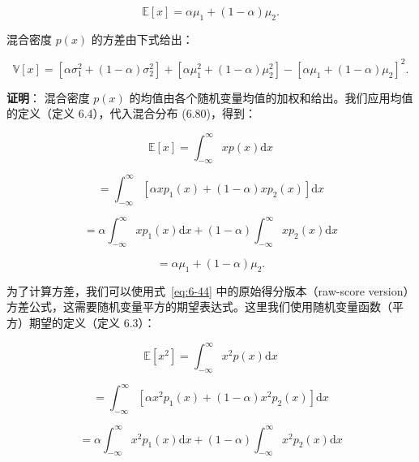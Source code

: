 \begin{equation}
\mathbb{E}[x] = \alpha \mu_1 + (1 - \alpha)\mu_2 .
\tag{6.81}\label{eq:6-81}
\end{equation}

混合密度 $ p(x) $ 的方差由下式给出：

\begin{equation}
\mathbb{V}[x] = [\alpha\sigma_1^2 + (1 - \alpha)\sigma_2^2] + [\alpha\mu_1^2 + (1 - \alpha)\mu_2^2] - [\alpha\mu_1 + (1 - \alpha)\mu_2]^2 .
\tag{6.82}\label{eq:6-82}
\end{equation}

\textbf{证明}： 混合密度 $ p(x) $ 的均值由各个随机变量均值的加权和给出。我们应用均值的定义（定义 6.4），代入混合分布 (6.80)，得到：

\begin{equation}
\mathbb{E}[x] = \int_{-\infty}^\infty x p(x) \mathrm{d}x
\tag{6.83a}\label{eq:6-83a}
\end{equation}

\begin{equation}
= \int_{-\infty}^\infty \left[\alpha x p_1(x) + (1 - \alpha) x p_2(x)\right] \mathrm{d}x
\tag{6.83b}\label{eq:6-83b}
\end{equation}

\begin{equation}
= \alpha \int_{-\infty}^\infty x p_1(x) \mathrm{d}x + (1 - \alpha) \int_{-\infty}^\infty x p_2(x) \mathrm{d}x
\tag{6.83c}\label{eq:6-83c}
\end{equation}

\begin{equation}
= \alpha \mu_1 + (1 - \alpha) \mu_2 .
\tag{6.83d}\label{eq:6-83d}
\end{equation}

为了计算方差，我们可以使用式~\eqref{eq:6-44} 中的原始得分版本（raw-score version）方差公式，这需要随机变量平方的期望表达式。这里我们使用随机变量函数（平方）期望的定义（定义 6.3）：

\begin{equation}
\mathbb{E}[x^2] = \int_{-\infty}^\infty x^2 p(x) \mathrm{d}x
\tag{6.84a}\label{eq:6-84a}
\end{equation}

\begin{equation}
= \int_{-\infty}^\infty \left[\alpha x^2 p_1(x) + (1 - \alpha) x^2 p_2(x)\right] \mathrm{d}x
\tag{6.84b}\label{eq:6-84b}
\end{equation}

\begin{equation}
= \alpha \int_{-\infty}^\infty x^2 p_1(x) \mathrm{d}x + (1 - \alpha) \int_{-\infty}^\infty x^2 p_2(x) \mathrm{d}x
\tag{6.84c}\label{eq:6-84c}
\end{equation}


